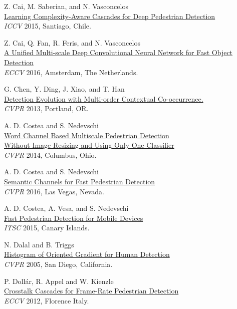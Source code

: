 \documentclass[onecolumn]{article}
\begin{document}
\begin{thebibliography}{1}
Z. Cai, M. Saberian, and N. Vasconcelos\\
\href{http://arxiv.org/abs/1507.05348}{
Learning Complexity-Aware Cascades for Deep Pedestrian Detection}\\
\textit{ICCV} 2015, Santiago, Chile.

Z. Cai, Q. Fan, R. Feris, and N. Vasconcelos\\
\href{https://arxiv.org/abs/1607.07155}{
A Unified Multi-scale Deep Convolutional Neural Network for Fast Object Detection}\\
\textit{ECCV} 2016, Amsterdam, The Netherlands.

G. Chen, Y. Ding, J. Xiao, and T. Han\\
\href{http://www.eecis.udel.edu/~ding/}{
Detection Evolution with Multi-order Contextual Co-occurrence.}\\
\textit{CVPR} 2013, Portland, OR.

A. D. Costea and S. Nedevschi\\
\href{http://www.cv-foundation.org/openaccess/content_cvpr_2014/papers/%
Costea_Word_Channel_Based_2014_CVPR_paper.pdf}{
Word Channel Based Multiscale Pedestrian Detection\\
Without Image Resizing and Using Only One Classifier}\\
\textit{CVPR} 2014, Columbus, Ohio.

A. D. Costea and S. Nedevschi\\
\href{http://www.cv-foundation.org/openaccess/content_cvpr_2016/papers/Costea_Semantic_Channels_for_CVPR_2016_paper.pdf}{
Semantic Channels for Fast Pedestrian Detection}\\
\textit{CVPR} 2016, Las Vegas, Nevada.

A. D. Costea, A. Vesa, and S. Nedevschi\\
\href{http://programme.exordo.com/itsc2015/delegates/presentation/388/}{
Fast Pedestrian Detection for Mobile Devices}\\
\textit{ITSC} 2015, Canary Islands.

N. Dalal and B. Triggs\\
\href{http://pascal.inrialpes.fr/soft/olt}{
Histogram of Oriented Gradient for Human Detection}\\
\textit{CVPR} 2005, San Diego, California.

P. Doll\'ar, R. Appel and W. Kienzle\\
\href{http://vision.ucsd.edu/~pdollar/research.html}{
Crosstalk Cascades for Frame-Rate Pedestrian Detection}\\
\textit{ECCV} 2012, Florence Italy.


\end{thebibliography}
\end{document}
